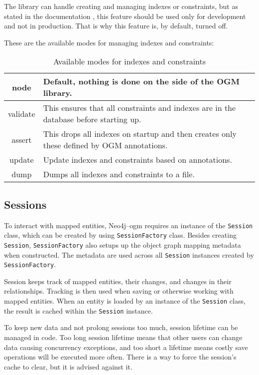 The library can handle creating and managing indexes or constraints, but as stated in the documentation \cite{neo4j_reference_nodate}, this feature should be used only for development and not in production. That is why this feature is, by default, turned off.

These are the available modes for managing indexes and constraints:
\begin{table}[H]
	\begin{center}
		\begin{tabularx}{\textwidth}{|c|p{}|}
			\hline
			node     & Default, nothing is done on the side of the OGM library.                                  \\
			\hline
			validate & This ensures that all constraints and indexes are in the database before starting up.     \\
			\hline
			assert   & This drops all indexes on startup and then creates only these defined by OGM annotations. \\
			\hline
			update   & Update indexes and constraints based on annotations.                                      \\
			\hline
			dump     & Dumps all indexes and constraints to a file.                                              \\
			\hline
		\end{tabularx}
		\caption{Available modes for indexes and constraints}
	\end{center}
\end{table}

\subsection{Sessions}
To interact with mapped entities, Neo4j--\acrshort{ogm} requires an instance of the \texttt{Session} class, which can be created by using \texttt{SessionFactory} class.
Besides creating \texttt{Session}, \texttt{SessionFactory} also setups up the object graph mapping metadata when constructed.
The metadata are used across all \texttt{Session} instances created by \texttt{SessionFactory}.

Session keeps track of mapped entities, their changes, and changes in their relationships.
Tracking is then used when saving or otherwise working with mapped entities.
When an entity is loaded by an instance of the \texttt{Session} class, the result is cached within the \texttt{Session} instance.

To keep new data and not prolong sessions too much, session lifetime can be managed in code.
Too long session lifetime means that other users can change data causing concurrency exceptions, and too short a lifetime means costly save operations will be executed more often.
There is a way to force the session's cache to clear, but it is advised against it.

